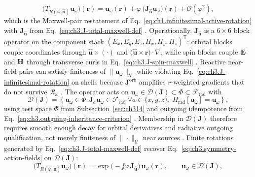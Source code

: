 \begin{equation}
\label{eq:ch3.J-infinitesimal-rotation}
\big(T_{R(\varphi,\hat{\mathbf{u}})}\mathbf{u}_\omega\big)(\mathbf{r})
=
\mathbf{u}_\omega(\mathbf{r})
+
\varphi\,\big(\mathbf{J}_{\hat{\mathbf{u}}}\mathbf{u}_\omega\big)(\mathbf{r})
+
\mathcal{O}(\varphi^{2}),
\end{equation}
which is the Maxwell-pair restatement of Eq.~\eqref{eq:ch1.infinitesimal-active-rotation} with
\(\mathbf{J}_{\hat{\mathbf{u}}}\) from Eq.~\eqref{eq:ch3.J-total-maxwell-def} \cite{jackson1999}.
Operationally, \(\mathbf{J}_{\hat{\mathbf{u}}}\) is a \(6\times 6\) block operator on the component stack
\((E_x,E_y,E_z,H_x,H_y,H_z)^{\mathsf{T}}\): orbital blocks couple coordinates through
\(\hat{\mathbf{u}}\times(\cdot)\) and \(\big(\hat{\mathbf{u}}\times\mathbf{r}\big)\cdot\nabla\), while spin
blocks couple \(\mathbf{E}\) and \(\mathbf{H}\) through transverse curls in Eq.~\eqref{eq:ch3.J-spin-maxwell}
\cite{belinfante1940}. Reactive near-field pairs can satisfy finiteness of
\(\|\mathbf{u}_\omega\|_{\mathcal{U}}\) while violating Eq.~\eqref{eq:ch3.J-infinitesimal-rotation} on shells
because \(\mathbf{J}^{\mathrm{orb}}\) amplifies \(r\)-weighted gradients that do not survive
\(\mathcal{R}_\omega\) \cite{stratton1941}.
The operator acts on
\(\mathbf{u}_\omega\in\mathcal{D}(\mathbf{J})\subset\Phi\subset\mathcal{F}_{\mathrm{rad}}\) with
\begin{equation}
\label{eq:ch3.J-operator-domain-rad}
\mathcal{D}(\mathbf{J})
=
\left\{
\mathbf{u}_\omega\in\Phi:
\mathbf{J}_{a}\mathbf{u}_\omega\in\mathcal{F}_{\mathrm{rad}}\ \forall a\in\{x,y,z\},\
\Pi_{\mathrm{rad}}[\mathbf{u}_\omega]=\mathbf{u}_\omega
\right\},
\end{equation}
using test space \(\Phi\) from Subsection~\ref{sec:ch314} and outgoing idempotence from
Eq.~\eqref{eq:ch3.outgoing-inheritance-criterion} \cite{kato1995}. Membership in
\(\mathcal{D}(\mathbf{J})\) therefore requires smooth enough decay for orbital derivatives and radiative
outgoing qualification, not merely finiteness of \(\|\cdot\|_{\mathcal{U}}\) near sources
\cite{stratton1941}.
Finite rotations generated by Eq.~\eqref{eq:ch3.J-total-maxwell-def} recover
Eq.~\eqref{eq:ch3.symmetry-action-fields} on \(\mathcal{D}(\mathbf{J})\):
\begin{equation}
\label{eq:ch3.rotation-from-J-generators}
\big(T_{R(\varphi,\hat{\mathbf{u}})}\mathbf{u}_\omega\big)(\mathbf{r})
=
\exp\!\big(-\jj\varphi\,\mathbf{J}_{\hat{\mathbf{u}}}\big)\,\mathbf{u}_\omega(\mathbf{r}),
\qquad
\mathbf{u}_\omega\in\mathcal{D}(\mathbf{J}),
\end{equation}
